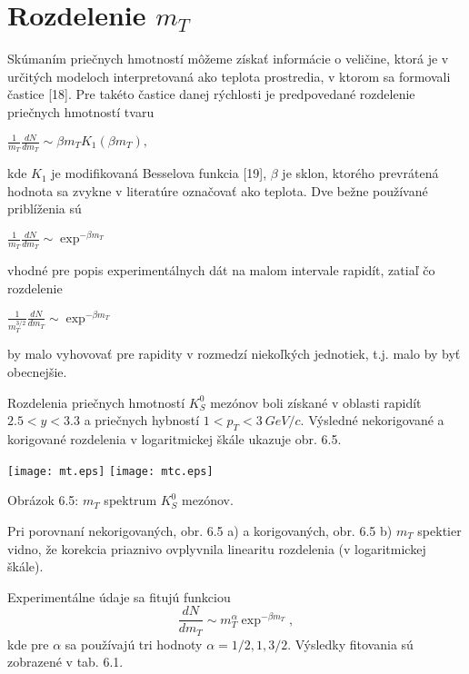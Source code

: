 \section{Rozdelenie $m_{T}$}
Skúmaním  priečnych hmotností  môžeme získať  informácie o
veličine, ktorá je v určitých modeloch interpretovaná ako teplota
prostredia, v ktorom sa formovali častice [18]. Pre takéto častice danej
rýchlosti je predpovedané  rozdelenie priečnych hmotností  tvaru
\begin{center}
  $\frac{1}{m_{T}}\frac{dN}{dm_{T}}\sim\beta m_{T} K_{1} (\beta m_{T}),$
\end{center}
kde $K_{1}$ je modifikovaná Besselova funkcia [19], $\beta$ je sklon, ktorého
prevrátená hodnota  sa zvykne v literatúre označovať ako  teplota.  Dve bežne
používané priblíženia sú
\begin{center}
  $ \frac{1}{m_{T}}\frac{dN}{dm_{T}}\sim \exp^{-\beta m_{T}}$
\end{center}
vhodné pre popis experimentálnych dát  na malom intervale rapidít, zatiaľ čo
rozdelenie
\begin{center}
  $ \frac{1}{m_{T}^{3/2}}\frac{dN}{dm_{T}}\sim \exp^{-\beta m_{T}} $
\end{center}
by  malo vyhovovať pre rapidity v rozmedzí niekoľkých jednotiek, t.j.  malo
by byť obecnejšie.

Rozdelenia priečnych hmotností $K^{0}_{S}$ mezónov boli získané v oblasti
rapidít $2.5<y<3.3$ a priečnych hybností $1<p_{T}<3\: GeV/c$. Výsledné
nekorigované a korigované rozdelenia v logaritmickej škále ukazuje obr. 6.5.

\newpage
\begin{center}
  \texttt{[image: mt.eps]}
  \texttt{[image: mtc.eps]}
\end{center}
\begin{center}
  Obrázok 6.5: $m_{T}$ spektrum $K^{0}_{S}$ mezónov.
\end{center}
Pri porovnaní nekorigovaných, obr. 6.5 a) a korigovaných, obr. 6.5 b)
$m_{T}$  spektier vidno, že korekcia priaznivo ovplyvnila linearitu
rozdelenia (v logaritmickej škále).

Experimentálne údaje sa fitujú funkciou
\begin{equation}
  \frac{dN}{dm_{T}} \sim m_{T}^{\alpha}\exp^{-\beta m_{T}},
\end{equation}
kde pre $\alpha$ sa používajú tri hodnoty $\alpha=1/2, 1, 3/2$.
Výsledky fitovania sú zobrazené v tab. 6.1.

